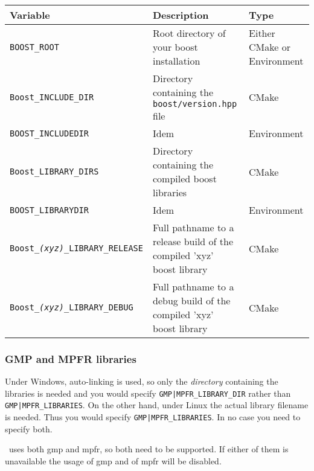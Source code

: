 {\ccTexHtml{\small}{}
\renewcommand{\arraystretch}{1.3}
\gdef\lcTabularBorder{2}
\begin{tabular}{|l|l|l|} \hline
  \textbf{Variable}                             & \textbf{Description}                                                 & \textbf{Type}\\\hline\hline
  \texttt{BOOST\_ROOT}\footnotemark[16]         & Root directory of your boost installation                            & Either CMake or Environment\\\hline
  \texttt{Boost\_INCLUDE\_DIR}                  & Directory containing the \texttt{boost/version.hpp} file             & CMake\\\hline
  \texttt{BOOST\_INCLUDEDIR}                    & Idem                                                                 & Environment\\\hline
  \texttt{Boost\_LIBRARY\_DIRS}                 & Directory containing the compiled boost libraries                    & CMake\\\hline
  \texttt{BOOST\_LIBRARYDIR}                    & Idem                                                                 & Environment\\\hline
  \texttt{Boost\_{\em (xyz)}\_LIBRARY\_RELEASE} & Full pathname to a release build of the compiled 'xyz' boost library & CMake\\\hline
  \texttt{Boost\_{\em (xyz)}\_LIBRARY\_DEBUG}   & Full pathname to a debug build of the compiled 'xyz' boost library   & CMake\\\hline
\end{tabular}
}
\addtocounter{footnote}{1}

\subsubsection{GMP and MPFR libraries}

Under Windows, auto-linking is used, so only the {\em directory} 
containing the libraries is needed and you would specify \texttt{GMP|MPFR\_LIBRARY\_DIR} rather than
\texttt{GMP|MPFR\_LIBRARIES}. On the other hand, under Linux the actual library filename is needed.
Thus you would specify \texttt{GMP|MPFR\_LIBRARIES}. In no case you need to specify both.

\cgal\ uses both gmp and mpfr, so both need to be supported. If either of them is unavailable the 
usage of gmp and of mpfr will be disabled.

